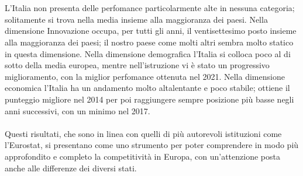 \documentclass[a4paper,12pt, openright]{report}
\newcommand\blankpage{%
    \null
    \thispagestyle{empty}%
    \addtocounter{page}{-1}%
    \newpage}
\begin{document}
\\
\\
L'Italia non presenta delle perfomance particolarmente alte in nessuna categoria; solitamente si trova nella media insieme alla maggioranza 
dei paesi. Nella dimensione Innovazione occupa, per tutti gli anni, il ventisettesimo posto insieme alla maggioranza dei paesi; il nostro 
paese come molti altri sembra molto statico in questa dimensione. Nella dimensione demografica l'Italia si colloca poco al di sotto della 
media europea, mentre nell'istruzione vi è stato un progressivo miglioramento, con la miglior perfomance ottenuta nel 2021. Nella dimensione
economica l'Italia ha un andamento molto altalentante e poco stabile; ottiene il punteggio migliore nel 2014 per poi raggiungere sempre posizione
più basse negli anni successivi, con un minimo nel 2017.  
\\
\\
Questi risultati, che sono in linea con quelli di più autorevoli istituzioni come l'Eurostat, si presentano come uno strumento per poter 
comprendere in modo più approfondito e completo la competitività in Europa, con un'attenzione posta anche alle differenze dei diversi stati. 



\afterpage{\blankpage}

\newpage


\cleardoublepage
{}
{}
\listoffigures

\newpage
\end{document}
